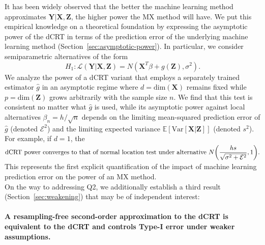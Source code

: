 \documentclass[ejs]{imsart}
\numberwithin{equation}{section}
\theoremstyle{plain}
\theoremstyle{definition}
\theoremstyle{remark}
\newcommand{\prx}{\bm X}
\newcommand{\prz}{\bm Z}
\newcommand{\pry}{{\bm Y}}
\begin{document}
It has been widely observed that the better the machine learning method approximates $\pry|\prx,\prz$, the higher power the MX method will have. We put this empirical knowledge on a theoretical foundation by expressing the asymptotic power of the dCRT in terms of the prediction error of the underlying machine learning method (Section~\ref{sec:asymptotic-power}). In particular, we consider semiparametric alternatives of the form
\begin{equation}
	H_1: \mathcal L(\pry|\prx,\prz) = N(\prx^T\beta + g(\prz),\sigma^2).
	\label{parametric-alternative-intro}
\end{equation}
We analyze the power of a dCRT variant that employs a separately trained estimator $\widehat g$ in an asymptotic regime where $d = \text{dim}(\prx)$ remains fixed while $p = \text{dim}(\prz)$ grows arbitrarily with the sample size $n$. We find that this test is consistent no matter what $\widehat g$ is used, while its asymptotic power against local alternatives $\beta_n = h/\sqrt{n}$ depends on the limiting mean-squared prediction error of $\widehat g$ (denoted $\mathcal E^2$) and the limiting expected variance $\mathbb E[\text{Var}[\prx | \prz]]$ (denoted $s^2$). For example, if $d = 1$, the
\begin{equation*}
	\begin{split}
		\text{dCRT power converges to that of normal location test under alternative } N\smash{\left(\frac{hs}{\sqrt{\sigma^2 + \mathcal E^2}},1\right)}.
	\end{split}
\end{equation*}
This represents the first explicit quantification of the impact of machine learning prediction error on the power of an MX method. \\

On the way to addressing Q2, we additionally establish a third result (Section~\ref{sec:weakening}) that may be of independent interest:

\paragraph{A resampling-free second-order approximation to the dCRT is equivalent to the dCRT and controls Type-I error under weaker assumptions.}
\end{document}
